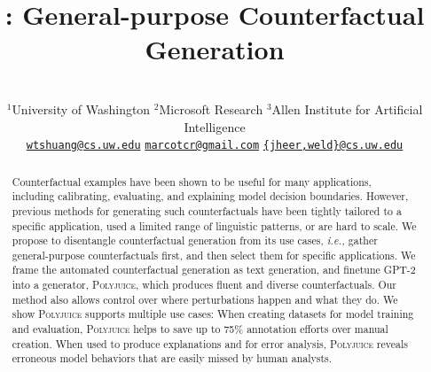 \documentclass[11pt,a4paper]{article}
\title{\sysname: General-purpose Counterfactual Generation \wts{or: Generating Counterfactuals \\for Improving, Explaining, and Analyzing Models}}
\author{
\makecell{
Tongshuang Wu$^{1}$ ~~~~~~~ 
Marco Tulio Ribeiro$^{2}$ ~~~~~~~ 
Jeffrey Heer$^{1}$ ~~~~~ 
Daniel S. Weld$^{1,3}$}  \\ 
$^{1}$University of Washington\hspace{5mm}
$^{2}$Microsoft Research\hspace{5mm} 
$^{3}$Allen Institute for Artificial Intelligence\hspace{5mm}\\
\hspace{-5mm}
\href{mailto:wtshuang@cs.uw.edu}{\texttt {wtshuang@cs.uw.edu}}
\hspace{5mm}
\href{mailto:marcotcr@microsoft.com}{\texttt {marcotcr@gmail.com}}
\hspace{10mm}
\href{mailto:dan@cs.washington.edu}{\texttt {\{jheer,weld\}@cs.uw.edu}}
}
\date{}
\newcommand{\sysname}{\textsc{Polyjuice}\xspace}
\newcommand{\ie}{\emph{i.e.,}\xspace}
\begin{document}
\maketitle
\begin{abstract}
Counterfactual examples have been shown to be useful for many applications, including calibrating, evaluating, and explaining model decision boundaries. 
However, previous methods for generating such counterfactuals have been tightly tailored to a specific application, used a limited range of linguistic patterns, or are hard to scale. 
We propose to disentangle counterfactual generation from its use cases, \ie gather general-purpose counterfactuals first, and then select them for specific applications. 
We frame the automated counterfactual generation as text generation, and finetune GPT-2 into a generator, \sysname, which produces fluent and diverse counterfactuals. 
Our method also allows control over where perturbations happen and what they do. 
We show \sysname supports multiple use cases: 
When creating datasets for model training and evaluation, \sysname helps to save up to 75\% annotation efforts over manual creation.
When used to produce explanations and for error analysis, \sysname reveals erroneous model behaviors that are easily missed by human analysts.

\end{abstract}











%



\clearpage
\newpage

\appendix

%





%
\end{document}
